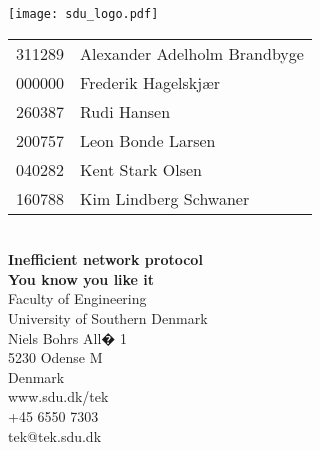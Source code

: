 \begin{titlepage}%
\begin{flushright}
\texttt{[image: sdu\_logo.pdf]}
\end{flushright}
\vspace*{2.7cm}
%
%
\setlength{\extrarowheight}{1.5pt}
\begin{tabular}{@{}l l}
	\textsf{\large{311289}} & \textsf{\large{Alexander Adelholm Brandbyge}}\\
	\textsf{\large{000000}} & \textsf{\large{Frederik Hagelskjær}}\\
	\textsf{\large{260387}} & \textsf{\large{Rudi Hansen}}\\
	\textsf{\large{200757}} & \textsf{\large{Leon Bonde Larsen}}\\
	\textsf{\large{040282}} & \textsf{\large{Kent Stark Olsen}}\\
	\textsf{\large{160788}} & \textsf{\large{Kim Lindberg Schwaner}}
\end{tabular}
\setlength{\extrarowheight}{0pt}
\vspace*{1.5cm}
\\
\textsf{\Huge{\textbf{\textcolor{FrontpageHeadingColor}{Inefficient network protocol}}}}
\vspace*{0.5cm}
\\
\textsf{\Large{\textbf{\textcolor{FrontpageHeadingColor}{You know you like it}}}}
\vfill
\textsf{\\Faculty of Engineering\\
University of Southern Denmark\\
Niels Bohrs All� 1\\
5230 Odense M\\
Denmark}
\vspace*{10pt}
\\
\textsf{www.sdu.dk/tek\\
+45 6550 7303\\
tek@tek.sdu.dk}
\end{titlepage}%